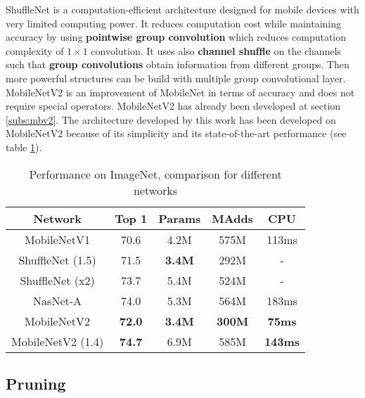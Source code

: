 %
ShuffleNet \cite{zhang_shufflenet_2018} is a computation-efficient architecture designed for mobile devices with very limited computing power. It reduces computation cost while maintaining accuracy by using \textbf{pointwise group convolution} which reduces computation complexity of $1 \times 1$ convolution. It uses also \textbf{channel shufﬂe} on the channels such that \textbf{group convolutions} obtain information from different groups. Then more powerful structures can be build  with multiple group convolutional layer. \newline \newline
%
MobileNetV2 \cite{sandler_mobilenetv2_2019} is an improvement of MobileNet in terms of accuracy and does not require special operators. MobileNetV2 has already been developed at section \ref{subs:mbv2}. The architecture developed by this work has been developed on MobileNetV2 because of its simplicity and its state-of-the-art performance (see table \ref{tab:mbv2}).
%
\begin{table}
    \center
    \begin{tabular}{ | c | c | c c | c| }
        \hline \hline
        Network & Top 1 & Params & MAdds & CPU \\
        \hline \hline
        MobileNetV1 & 70.6 & 4.2M & 575M & 113ms \\
        ShuffleNet (1.5) & 71.5 & \textbf{3.4M} & 292M & - \\
        ShuffleNet (x2)  & 73.7 & 5.4M & 524M & - \\
        NasNet-A & 74.0 & 5.3M & 564M & 183ms \\
        \hline
        MobileNetV2 & \textbf{72.0} & \textbf{3.4M} & \textbf{300M} & \textbf{75ms} \\
        MobileNetV2 (1.4) & \textbf{74.7} & 6.9M & 585M & \textbf{143ms} \\
        \hline \hline
    \end{tabular}
    \caption{Performance on ImageNet, comparison for different networks \cite{sandler_mobilenetv2_2019}}
    \label{tab:mbv2}
\end{table}
\subsection{Pruning}

